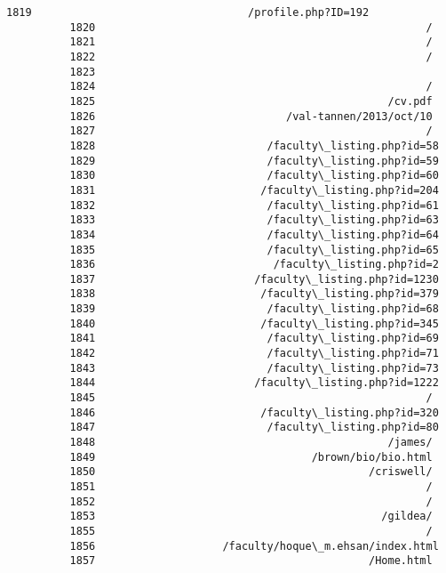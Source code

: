 \documentclass[11pt]{article}
\begin{document}
\begin{Verbatim}[commandchars=\\\{\}]
          1819                                  /profile.php?ID=192
          1820                                                    /
          1821                                                    /
          1822                                                    /
          1823                                                     
          1824                                                    /
          1825                                              /cv.pdf
          1826                              /val-tannen/2013/oct/10
          1827                                                    /
          1828                           /faculty\_listing.php?id=58
          1829                           /faculty\_listing.php?id=59
          1830                           /faculty\_listing.php?id=60
          1831                          /faculty\_listing.php?id=204
          1832                           /faculty\_listing.php?id=61
          1833                           /faculty\_listing.php?id=63
          1834                           /faculty\_listing.php?id=64
          1835                           /faculty\_listing.php?id=65
          1836                            /faculty\_listing.php?id=2
          1837                         /faculty\_listing.php?id=1230
          1838                          /faculty\_listing.php?id=379
          1839                           /faculty\_listing.php?id=68
          1840                          /faculty\_listing.php?id=345
          1841                           /faculty\_listing.php?id=69
          1842                           /faculty\_listing.php?id=71
          1843                           /faculty\_listing.php?id=73
          1844                         /faculty\_listing.php?id=1222
          1845                                                    /
          1846                          /faculty\_listing.php?id=320
          1847                           /faculty\_listing.php?id=80
          1848                                              /james/
          1849                                  /brown/bio/bio.html
          1850                                           /criswell/
          1851                                                    /
          1852                                                    /
          1853                                             /gildea/
          1855                                                    /
          1856                    /faculty/hoque\_m.ehsan/index.html
          1857                                           /Home.html

\end{Verbatim}
\end{document}

